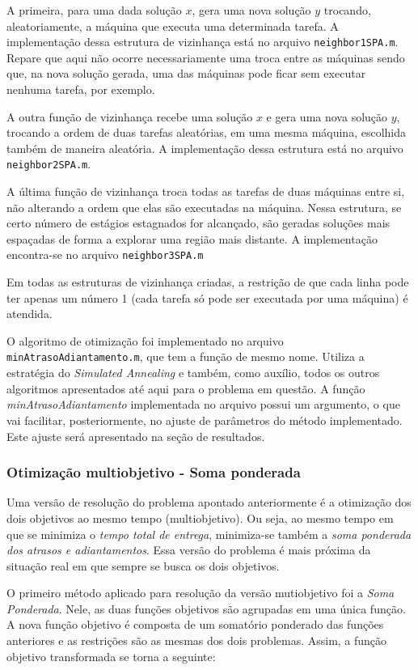 \documentclass[conference]{IEEEtran}
\begin{document}
A primeira, para uma dada solução $x$, gera uma nova solução $y$ trocando, aleatoriamente, a máquina que executa uma determinada tarefa. A implementação dessa estrutura de vizinhança está no arquivo \texttt{neighbor1SPA.m}. Repare que aqui não ocorre necessariamente uma troca entre as máquinas sendo que, na nova solução gerada, uma das máquinas pode ficar sem executar nenhuma tarefa, por exemplo.

A outra função de vizinhança recebe uma solução $x$ e gera uma nova solução $y$, trocando a ordem de duas tarefas aleatórias, em uma mesma máquina, escolhida também de maneira aleatória. A implementação dessa estrutura está no arquivo \texttt{neighbor2SPA.m}.

A última função de vizinhança troca todas as tarefas de duas máquinas entre si, não alterando a ordem que elas são executadas na máquina. Nessa estrutura, se certo número de estágios estagnados for alcançado, são geradas soluções mais espaçadas de forma a explorar uma região mais distante. A implementação encontra-se no arquivo \texttt{neighbor3SPA.m}

Em todas as estruturas de vizinhança criadas, a restrição de que cada linha pode ter apenas um número 1 (cada tarefa só pode ser executada por uma máquina) é atendida.

O algoritmo de otimização foi implementado no arquivo \texttt{minAtrasoAdiantamento.m}, que tem a função de mesmo nome. Utiliza a estratégia do \textit{Simulated Annealing} e também, como auxílio, todos os outros algoritmos apresentados até aqui para o problema em questão. A função \textit{minAtrasoAdiantamento} implementada no arquivo possui um argumento, o que vai facilitar, posteriormente, no ajuste de parâmetros do método implementado. Este ajuste será apresentado na seção de resultados.

\subsubsection{Otimização multiobjetivo - Soma ponderada}
Uma versão de resolução do problema apontado anteriormente é a otimização dos dois objetivos ao mesmo tempo (multiobjetivo). Ou seja, ao mesmo tempo em que se minimiza o \emph{tempo total de entrega}, minimiza-se também a \emph{soma ponderada dos atrasos e adiantamentos}. Essa versão do problema é mais próxima da situação real em que sempre se busca os dois objetivos.

O primeiro método  aplicado para resolução da versão mutiobjetivo foi a \emph{Soma Ponderada}. Nele, as duas funções objetivos são agrupadas em uma única função. A nova função objetivo é composta de um somatório ponderado das funções anteriores e as restrições são as mesmas dos dois problemas. Assim, a função objetivo transformada se torna a seguinte:
\end{document}
